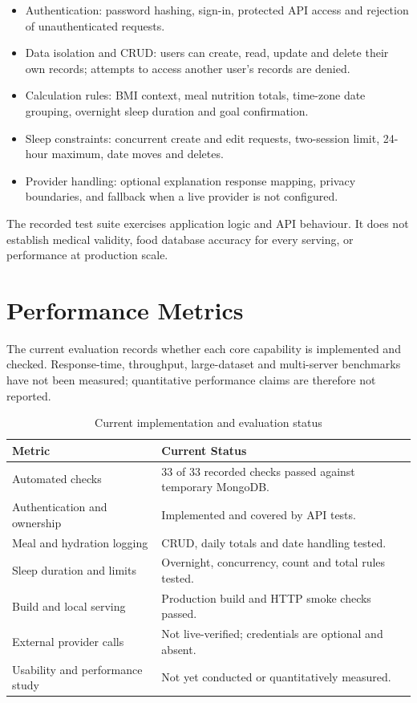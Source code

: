 \documentclass[10pt,a4paper,openany]{report}
\begin{document}
\begin{itemize}
\item Authentication: password hashing, sign-in, protected API access and rejection of unauthenticated requests.
\item Data isolation and CRUD: users can create, read, update and delete their own records; attempts to access another user's records are denied.
\item Calculation rules: BMI context, meal nutrition totals, time-zone date grouping, overnight sleep duration and goal confirmation.
\item Sleep constraints: concurrent create and edit requests, two-session limit, 24-hour maximum, date moves and deletes.
\item Provider handling: optional explanation response mapping, privacy boundaries, and fallback when a live provider is not configured.
\end{itemize}

The recorded test suite exercises application logic and API behaviour. It does not establish medical validity, food database accuracy for every serving, or performance at production scale.

\section{Performance Metrics}
The current evaluation records whether each core capability is implemented and checked. Response-time, throughput, large-dataset and multi-server benchmarks have not been measured; quantitative performance claims are therefore not reported.
\clearpage

\begin{table}[ht]
\centering
\small
\begin{tabular}{p{}|p{}}
\toprule
\textbf{Metric} & \textbf{Current Status}\\
\midrule
Automated checks & 33 of 33 recorded checks passed against temporary MongoDB.\\
Authentication and ownership & Implemented and covered by API tests.\\
Meal and hydration logging & CRUD, daily totals and date handling tested.\\
Sleep duration and limits & Overnight, concurrency, count and total rules tested.\\
Build and local serving & Production build and HTTP smoke checks passed.\\
External provider calls & Not live-verified; credentials are optional and absent.\\
Usability and performance study & Not yet conducted or quantitatively measured.\\
\bottomrule
\end{tabular}
\caption{Current implementation and evaluation status}
\end{table}
\end{document}
